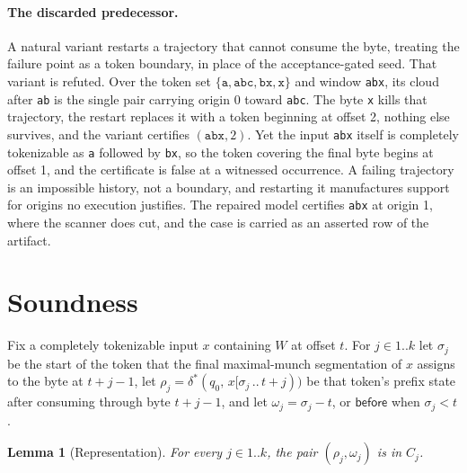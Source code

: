\documentclass[11pt,a4paper]{article}
\theoremstyle{definition}
\theoremstyle{plain}
\newtheorem{lemma}{Lemma}
\newcommand{\code}[1]{\texttt{#1}}
\newcommand{\before}{\mathsf{before}}
\begin{document}
\paragraph{The discarded predecessor.} A natural variant restarts a trajectory that cannot consume the byte, treating
the failure point as a token boundary, in place of the acceptance-gated seed. That variant is refuted. Over the token
set $\{\code{a}, \code{abc}, \code{bx}, \code{x}\}$ and window \code{abx}, its cloud after \code{ab} is the single pair
carrying origin 0 toward \code{abc}. The byte \code{x} kills that trajectory, the restart replaces it with a token
beginning at offset 2, nothing else survives, and the variant certifies $(\code{abx}, 2)$. Yet the input \code{abx}
itself is completely tokenizable as \code{a} followed by \code{bx}, so the token covering the final byte begins at
offset 1, and the certificate is false at a witnessed occurrence. A failing trajectory is an impossible history, not a
boundary, and restarting it manufactures support for origins no execution justifies. The repaired model certifies
\code{abx} at origin 1, where the scanner does cut, and the case is carried as an asserted row of the artifact.

\section{Soundness}
\label{sec:soundness}

Fix a completely tokenizable input $x$ containing $W$ at offset $t$. For $j \in 1..k$ let $\sigma_j$ be the start of the
token that the final maximal-munch segmentation of $x$ assigns to the byte at $t+j-1$, let
$\rho_j = \delta^*(q_0,\, x[\sigma_j \,..\, t+j))$ be that token's prefix state after consuming through byte $t+j-1$,
and let $\omega_j = \sigma_j - t$, or $\before$ when $\sigma_j < t$.

\begin{lemma}[Representation]
\label{lem:representation}
For every $j \in 1..k$, the pair $(\rho_j, \omega_j)$ is in $C_j$.
\end{lemma}
\end{document}
